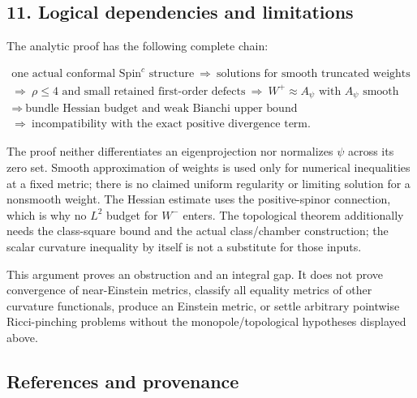 \documentclass[
  10pt,
]{article}
\begin{document}
\hypertarget{logical-dependencies-and-limitations}{%
\subsection{11. Logical dependencies and
limitations}\label{logical-dependencies-and-limitations}}

The analytic proof has the following complete chain:

\[
 \begin{gathered}
 \text{one actual conformal Spin}^c\text{ structure}
 \ \Longrightarrow\ \text{solutions for smooth truncated weights}\\
 \Longrightarrow\ \rho\le4\text{ and small retained first-order defects}
 \ \Longrightarrow\ W^+\approx A_\psi\text{ with }A_\psi\text{ smooth}\\
 \Longrightarrow\ \text{bundle Hessian budget and weak Bianchi upper bound}\\
 \Longrightarrow\ \text{incompatibility with the exact positive divergence term}.
 \end{gathered}
\]

The proof neither differentiates an eigenprojection nor normalizes
\(\psi\) across its zero set. Smooth approximation of weights is used
only for numerical inequalities at a fixed metric; there is no claimed
uniform regularity or limiting solution for a nonsmooth weight. The
Hessian estimate uses the positive-spinor connection, which is why no
\(L^2\) budget for \(W^-\) enters. The topological theorem additionally
needs the class-square bound and the actual class/chamber construction;
the scalar curvature inequality by itself is not a substitute for those
inputs.

This argument proves an obstruction and an integral gap. It does not
prove convergence of near-Einstein metrics, classify all equality
metrics of other curvature functionals, produce an Einstein metric, or
settle arbitrary pointwise Ricci-pinching problems without the
monopole/topological hypotheses displayed above.

\hypertarget{references-and-provenance}{%
\subsection{References and provenance}\label{references-and-provenance}}
\end{document}
